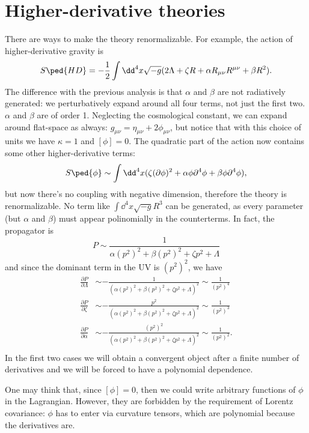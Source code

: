 \documentclass[a4paper,12pt]{book}
\begin{document}
\section{Higher-derivative theories}
There are ways to make the theory renormalizable. For example, the action of higher-derivative gravity is
\[S\ped{HD}=-\frac1{2}\int\dd^4x\sqrt{-g}(2\Lambda+\zeta R+\alpha R_{\mu\nu}R^{\mu\nu}+\beta R^2).\]
The difference with the previous analysis is that $\alpha$ and $\beta$ are not radiatively generated: we perturbatively expand around all four terms, not just the first two. $\alpha$ and $\beta$ are of order 1. Neglecting the cosmological constant, we can expand around flat-space as always: $g_{\mu\nu}=\eta_{\mu\nu}+2\phi_{\mu\nu}$, but notice that with this choice of units we have $\kappa=1$ and $[\phi]=0$. The quadratic part of the action now contains some other higher-derivative terms:
\[S\ped{\phi}\sim\int\dd^4x(\zeta(\partial\phi)^2+\alpha\phi\partial^4\phi+\beta\phi\partial^4\phi),\]
but now there's no coupling with negative dimension, therefore the theory is renormalizable. No term like $\int\dd^4x\sqrt{-g}R^3$ can be generated, as every parameter (but $\alpha$ and $\beta$) must appear polinomially in the counterterms. In fact, the propagator is
\[P\sim\frac1{\alpha(p^2)^2+\beta(p^2)^2+\zeta p^2+\Lambda}\]
and since the dominant term in the UV is $(p^2)^2$, we have
\begin{align*}
\frac{\partial P}{\partial\Lambda}&\sim-\frac{1}{(\alpha(p^2)^2+\beta(p^2)^2+\zeta p^2+\Lambda)^2}\sim\frac1{(p^2)^4}\\
\frac{\partial P}{\partial\zeta}&\sim-\frac{p^2}{(\alpha(p^2)^2+\beta(p^2)^2+\zeta p^2+\Lambda)^2}\sim\frac1{(p^2)^3}\\
\frac{\partial P}{\partial\alpha}&\sim-\frac{(p^2)^2}{(\alpha(p^2)^2+\beta(p^2)^2+\zeta p^2+\Lambda)^2}\sim\frac1{(p^2)^2}.\\
\end{align*}
In the first two cases we will obtain a convergent object after a finite number of derivatives and we will be forced to have a polynomial dependence.

One may think that, since $[\phi]=0$, then we could write arbitrary functions of $\phi$ in the Lagrangian. However, they are forbidden by the requirement of Lorentz covariance: $\phi$ has to enter via curvature tensors, which are polynomial because the derivatives are.
\end{document}
